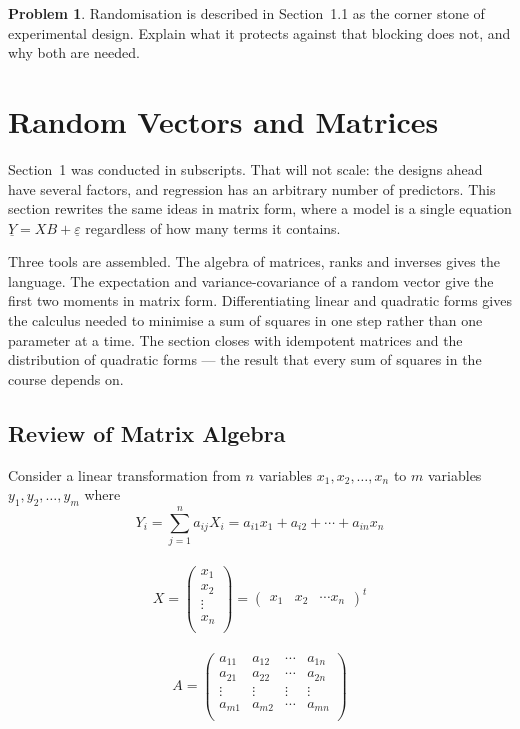 \documentclass[11pt,a4paper]{article}
\theoremstyle{definition}
\newtheorem{problemx}{Problem}[section]
\newenvironment{problem}{\begin{problemx}}{\end{problemx}}
\begin{document}
\begin{problem}
Randomisation is described in Section~1.1 as the corner stone of experimental
design. Explain what it protects against that blocking does not, and why both
are needed.
\end{problem}

\pagebreak
\section{Random Vectors and Matrices}
Section~1 was conducted in subscripts. That will not scale: the designs ahead
have several factors, and regression has an arbitrary number of predictors.
This section rewrites the same ideas in matrix form, where a model is a single
equation $\underline{Y}=XB+\underline{\varepsilon}$ regardless of how many
terms it contains.

Three tools are assembled. The algebra of matrices, ranks and inverses gives
the language. The expectation and variance-covariance of a random vector give
the first two moments in matrix form. Differentiating linear and quadratic
forms gives the calculus needed to minimise a sum of squares in one step
rather than one parameter at a time. The section closes with idempotent
matrices and the distribution of quadratic forms --- the result that every
sum of squares in the course depends on.



\subsection{Review of Matrix Algebra}
Consider a linear transformation from $n$ variables $x_1,x_2,\ldots ,x_n$ to $m$ variables $y_1,y_2,\ldots ,y_m$ where $$Y_i=\sum^n_{j=1}a_{ij}X_i=a_{i1}x_1+a_{i2}+\cdots + a_{in}x_n$$\\

$$X=
\begin{pmatrix}
x_1\\
x_2\\
\vdots\\
x_n\\
\end{pmatrix}
=
\begin{pmatrix}
x_1 & x_2 & \cdots x_n
\end{pmatrix}^t
$$\\


$$A=
\begin{pmatrix}
a_{11} & a_{12} & \cdots & a_{1n}\\
a_{21} & a_{22} & \cdots & a_{2n}\\
\vdots & \vdots & \vdots       & \vdots\\
a_{m1} & a_{m2} & \cdots & a_{mn}\\
\end{pmatrix}
$$\\
\end{document}
